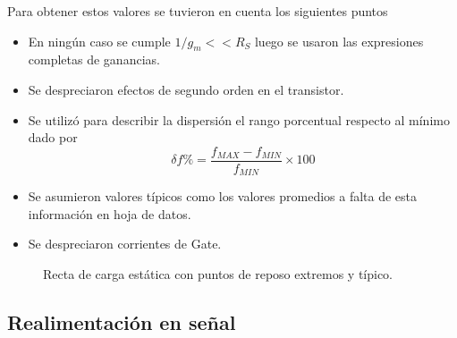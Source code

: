 \documentclass[a4paper, 10pt, spanish]{article}
\begin{document}
Para obtener estos valores se tuvieron en cuenta los siguientes puntos

\begin{itemize}
	\item En ningún caso se cumple $1/g_m << R_S$ luego se usaron las expresiones completas de ganancias.
	\item Se despreciaron efectos de segundo orden en el transistor.
	\item Se utilizó para describir la dispersión el rango porcentual respecto al mínimo dado por
		\begin{equation}
		\delta f \% = \frac{f_{MAX}-f_{MIN}}{f_{MIN}}\times 100 \nonumber
		\end{equation}
	\item Se asumieron valores típicos como los valores promedios a falta de esta información en hoja de datos.
	\item Se despreciaron corrientes de Gate.
	\end{itemize}


\begin{figure}[h]
    \begin{center}

    \end{center}
    \caption{Recta de carga estática con puntos de reposo extremos y típico.}
    \label{fig:recta_estatica_q}
    \end{figure}


\newpage
\subsection{Realimentación en señal}
\end{document}
